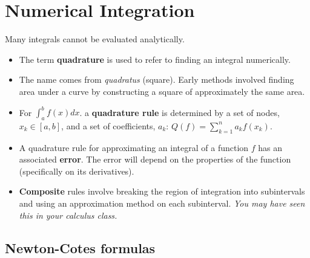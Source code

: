 \documentclass[12pt,letterpaper,noanswers]{exam}
\begin{document}
\section*{Numerical Integration}

Many integrals cannot be evaluated analytically.

\begin{tcolorbox}
\begin{itemize}
\itemsep0em
    \item The term \textbf{quadrature} is used to refer to finding an integral numerically.
    \item The name comes from \emph{quadratus} (square).  Early methods involved finding area under a curve by constructing a square of approximately the same area.
     \item For $\displaystyle\int_a^b f(x)dx$. a \textbf{quadrature rule} is determined by a set of nodes, $x_k \in [a,b]$, and a set of coefficients, $a_k$: $\displaystyle Q(f) = \sum\limits_{k=1}^n a_k f(x_k)$. 
     \item A quadrature rule for approximating an integral of a function $f$ has an associated \textbf{error}.  The error will depend on the properties of the function (specifically on its derivatives).
    \end{itemize}
    \end{tcolorbox}
    
\begin{tcolorbox}
\begin{itemize}
\itemsep0em    
   
    
    
    \item \textbf{Composite} rules involve breaking the region of integration into subintervals and using an approximation method on each subinterval.  \emph{You may have seen this in your calculus class.}
\end{itemize}
\end{tcolorbox}

\subsection*{Newton-Cotes formulas}
\end{document}
